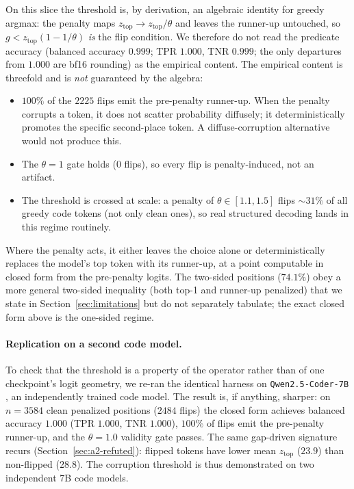 \documentclass[11pt]{article}
\newcommand{\ztop}{z_{\mathrm{top}}}
\newcommand{\thp}{\theta}
\newcommand{\code}[1]{\texttt{#1}}
\begin{document}
On this slice the threshold is, by derivation, an algebraic identity for greedy argmax: the
penalty maps $\ztop\to\ztop/\thp$ and leaves the runner-up untouched, so $g<\ztop(1-1/\thp)$
\emph{is} the flip condition. We therefore do not read the predicate accuracy
(balanced accuracy $0.999$; TPR $1.000$, TNR $0.999$; the only departures from $1.000$ are
bf16 rounding) as the empirical content. The empirical content is threefold and is \emph{not}
guaranteed by the algebra:
\begin{itemize}
\item $100\%$ of the $2225$ flips emit the pre-penalty runner-up. When the penalty
corrupts a token, it does not scatter probability diffusely; it deterministically promotes
the specific second-place token. A diffuse-corruption alternative would not produce this.
\item The $\thp=1$ gate holds (0 flips), so every flip is penalty-induced, not an
artifact.
\item The threshold is crossed at scale: a penalty of
$\thp\in[1.1,1.5]$ flips $\sim$$31\%$ of all greedy code tokens (not only clean ones), so
real structured decoding lands in this regime routinely.
\end{itemize}
Where the penalty acts, it
either leaves the choice alone or deterministically replaces the model's top token with its
runner-up, at a point computable in closed form from the pre-penalty logits. The two-sided
positions ($74.1\%$) obey a more general two-sided inequality (both top-1 and runner-up
penalized) that we state in Section~\ref{sec:limitations} but do not separately tabulate; the
exact closed form above is the one-sided regime.

\paragraph{Replication on a second code model.} To check that the threshold is a property of
the operator rather than of one checkpoint's logit geometry, we re-ran the identical harness
on \code{Qwen2.5-Coder-7B} \citep{hui2024qwen25coder}, an independently trained code model.
The result is, if anything, sharper: on $n=3584$ clean penalized positions ($2484$ flips)
the closed form achieves balanced accuracy $1.000$ (TPR $1.000$, TNR $1.000$),
$100\%$ of flips emit the pre-penalty runner-up, and the $\thp=1.0$ validity gate
passes. The same gap-driven signature recurs (Section~\ref{sec:a2-refuted}): flipped tokens
have lower mean $\ztop$ ($23.9$) than non-flipped ($28.8$). The corruption threshold is thus
demonstrated on two independent 7B code models.
\end{document}
